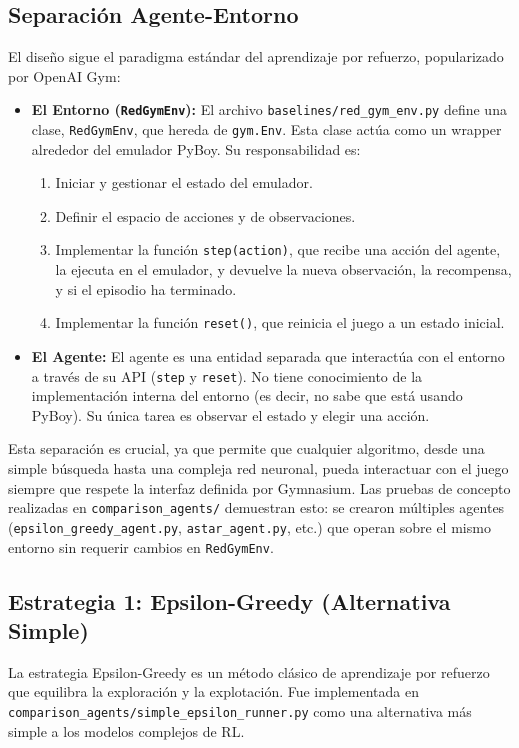 \documentclass[12pt, oneside, openany]{book}
\begin{document}
\subsection{Separación Agente-Entorno}
El diseño sigue el paradigma estándar del aprendizaje por refuerzo, popularizado por OpenAI Gym:
\begin{itemize}
    \item \textbf{El Entorno (\texttt{RedGymEnv}):} El archivo \texttt{baselines/red\_gym\_env.py} define una clase, \texttt{RedGymEnv}, que hereda de \texttt{gym.Env}. Esta clase actúa como un wrapper alrededor del emulador PyBoy. Su responsabilidad es:
    \begin{enumerate}
        \item Iniciar y gestionar el estado del emulador.
        \item Definir el espacio de acciones y de observaciones.
        \item Implementar la función \texttt{step(action)}, que recibe una acción del agente, la ejecuta en el emulador, y devuelve la nueva observación, la recompensa, y si el episodio ha terminado.
        \item Implementar la función \texttt{reset()}, que reinicia el juego a un estado inicial.
    \end{enumerate}
    \item \textbf{El Agente:} El agente es una entidad separada que interactúa con el entorno a través de su API (\texttt{step} y \texttt{reset}). No tiene conocimiento de la implementación interna del entorno (es decir, no sabe que está usando PyBoy). Su única tarea es observar el estado y elegir una acción.
\end{itemize}

Esta separación es crucial, ya que permite que cualquier algoritmo, desde una simple búsqueda hasta una compleja red neuronal, pueda interactuar con el juego siempre que respete la interfaz definida por Gymnasium. Las pruebas de concepto realizadas en \texttt{comparison\_agents/} demuestran esto: se crearon múltiples agentes (\texttt{epsilon\_greedy\_agent.py}, \texttt{astar\_agent.py}, etc.) que operan sobre el mismo entorno sin requerir cambios en \texttt{RedGymEnv}.

\subsection{Estrategia 1: Epsilon-Greedy (Alternativa Simple)}
La estrategia Epsilon-Greedy es un método clásico de aprendizaje por refuerzo que equilibra la exploración y la explotación. Fue implementada en \texttt{comparison\_agents/simple\_epsilon\_runner.py} como una alternativa más simple a los modelos complejos de RL.
\end{document}
